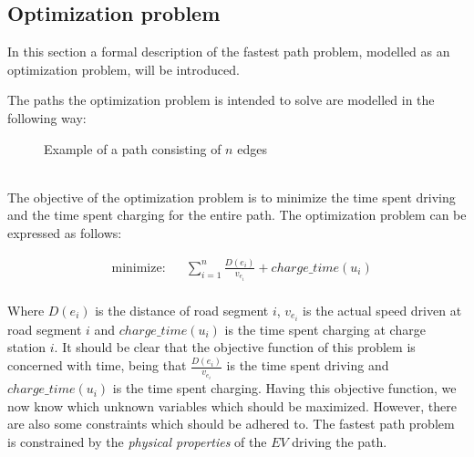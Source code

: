 \subsection{Optimization problem}
In this section a formal description of the fastest path problem, modelled as an optimization problem, will be introduced.

The paths the optimization problem is intended to solve are modelled in the following way: \\
\begin{figure}[h!]
\centering
    \caption{Example of a path consisting of $n$ edges} \label{fig:pathexample}
\end{figure} \\

The objective of the optimization problem is to minimize the time spent driving 
and the time spent charging for the entire path. The optimization problem can be expressed as follows:

\begin{equation}
	\begin{aligned} & 
	{\text{minimize:}}
	& & \sum_{i=1}^{n} \frac{D(e_i)}{v_{e_i}} + charge\_time(u_i) \\
	\end{aligned}
\end{equation}\label{eq:objfunction}

Where $D(e_i)$ is the distance of road segment $i$, $v_{e_i}$ is the actual speed driven at road segment $i$ and $charge\_time(u_i)$ is the time spent charging at charge station $i$. It should be clear that the objective function of this problem is concerned with time, being that $\frac{D(e_i)}{v_{e_i}}$ is the time spent driving and $charge\_time(u_i)$ is the time spent charging. Having this objective function, we now know which unknown variables which should be maximized. However, there are also some constraints which should be adhered to. The fastest path problem is constrained by the \emph{physical properties} of the $EV$ driving the path.  

